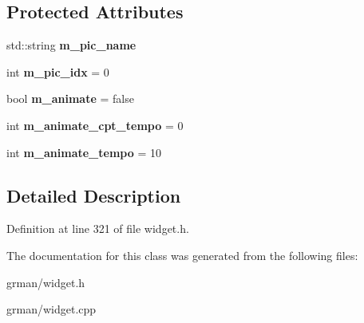 \subsection*{Protected Attributes}
\begin{DoxyCompactItemize}
\item 
\mbox{\label{classgrman_1_1_widget_image_ab8c9481e7cc708006598812bf25ce233}} 
std\+::string {\bfseries m\+\_\+pic\+\_\+name}
\item 
\mbox{\label{classgrman_1_1_widget_image_ad5bf61889812d0eee9be1fac140a1764}} 
int {\bfseries m\+\_\+pic\+\_\+idx} = 0
\item 
\mbox{\label{classgrman_1_1_widget_image_a3f9de67569947007110680dcb17b97eb}} 
bool {\bfseries m\+\_\+animate} = false
\item 
\mbox{\label{classgrman_1_1_widget_image_af92a7de5a4447417bc7ce4e12947acb8}} 
int {\bfseries m\+\_\+animate\+\_\+cpt\+\_\+tempo} = 0
\item 
\mbox{\label{classgrman_1_1_widget_image_a9d24ac9f396873fc0c0a6cf0680e8d54}} 
int {\bfseries m\+\_\+animate\+\_\+tempo} = 10
\end{DoxyCompactItemize}


\subsection{Detailed Description}


Definition at line 321 of file widget.\+h.



The documentation for this class was generated from the following files\+:\begin{DoxyCompactItemize}
\item 
grman/widget.\+h\item 
grman/widget.\+cpp\end{DoxyCompactItemize}
